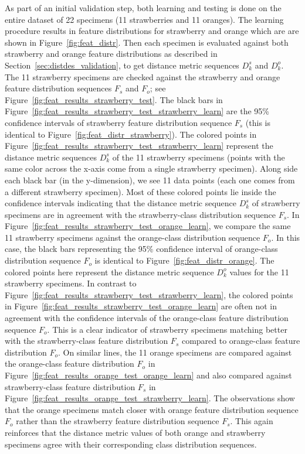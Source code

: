 As part of an initial validation step, both learning and testing is done on the entire dataset of 22 specimens (11 strawberries and 11 oranges). The learning procedure
results in feature distributions for strawberry and orange which are are shown in Figure~\ref{fig:feat_distr}. Then each specimen is evaluated against both strawberry and orange feature distributions as described in Section~\ref{sec:distdes_validation}, to get distance metric sequences $D^s_k$ and $D^o_k$. The 11 strawberry specimens are checked against the strawberry and orange feature distribution sequences $F_{s}$ and $F_{o}$; see Figure~\ref{fig:feat_results_strawberry_test}. The black bars in Figure~\ref{fig:feat_results_strawberry_test_strawberry_learn} are the 95\% confidence intervals of strawberry feature distribution sequence $F_{s}$ (this is identical to Figure~\ref{fig:feat_distr_strawberry}).
The colored points in Figure~\ref{fig:feat_results_strawberry_test_strawberry_learn} represent the distance metric sequences $D^s_k$ of the 11 strawberry specimens (points with the same color across the x-axis come from a single strawberry specimen). Along side each black bar (in the y-dimension), we see 11 data points (each one comes from a different strawberry specimen).
Most of these colored points lie inside the confidence intervals indicating that the 
distance metric sequence $D^s_k$ of strawberry specimens are in agreement with the strawberry-class distribution sequence $F_{s}$.
In Figure~\ref{fig:feat_results_strawberry_test_orange_learn}, we compare the same 11 strawberry specimens against the orange-class distribution sequence $F_{o}$. In this case, the black bars representing the 95\% confidence interval of orange-class distribution sequence $F_{o}$ is identical to 
Figure~\ref{fig:feat_distr_orange}. The colored points here represent the distance metric sequence $D^o_k$ values for the 11 strawberry specimens.
In contrast to Figure~\ref{fig:feat_results_strawberry_test_strawberry_learn}, the colored points in Figure~\ref{fig:feat_results_strawberry_test_orange_learn} are often not in agreement with the confidence intervals of the orange-class feature distribution sequence $F_{o}$.
This is a clear indicator of strawberry specimens matching better with the strawberry-class feature distribution $F_s$ compared to orange-class feature distribution $F_o$. On similar lines, the 11 orange specimens are compared against the orange-class feature distribution $F_{o}$ in Figure~\ref{fig:feat_results_orange_test_orange_learn} and also compared against strawberry-class feature distribution $F_{s}$ in Figure~\ref{fig:feat_results_orange_test_strawberry_learn}. The observations show that the orange specimens match closer with orange feature distribution sequence $F_{o}$ rather than the strawberry feature distribution sequence $F_{s}$. This again reinforces that the distance metric 
values of both orange and strawberry specimens agree with their corresponding class distribution sequences.

